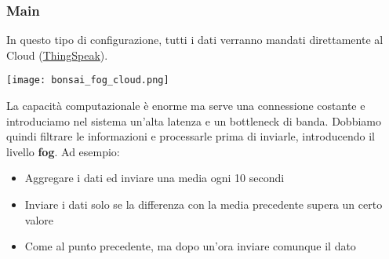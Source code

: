 \subsubsection{Main}
In questo tipo di configurazione, tutti i dati verranno mandati direttamente al Cloud (\hyperref{https://thingspeak.com/}{}{}{ThingSpeak}).
\begin{center}
	\texttt{[image: bonsai\_fog\_cloud.png]}
\end{center}
La capacità computazionale è enorme ma serve una connessione costante e introduciamo nel sistema un'alta latenza e un bottleneck di banda. Dobbiamo quindi filtrare le informazioni e processarle prima di inviarle, introducendo il livello \textbf{fog}. Ad esempio:
\begin{itemize}
	\item Aggregare i dati ed inviare una media ogni 10 secondi
	\item Inviare i dati solo se la differenza con la media precedente supera un certo valore
	\item Come al punto precedente, ma dopo un'ora inviare comunque il dato
\end{itemize}